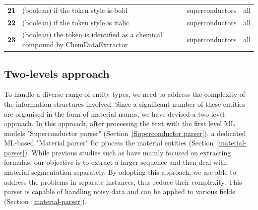 \begin{table}
\begin{tabular}{l m{30em} c c}
        \textbf{21}   & (boolean) if the token style is bold & superconductors & all                   \\
        \textbf{22}   & (boolean) if the token style is italic & superconductors & all                   \\
        \textbf{23}   & (boolean) the token is identified as a chemical compound by ChemDataExtractor\cite{chemdataextractor}                                                                                                                                                    & superconductors & all                   \\
        \bottomrule
    \end{tabular}
    \label{tab:ML-model-features}
\end{table}

\subsection{Two-levels approach}
\label{sec:two-levels-approach}

To handle a diverse range of entity types, we need to address the complexity of the information structures involved. Since a significant number of these entities are organised in the form of material names, we have devised a two-level approach. In this approach, after processing the text with the first level ML models "Superconductor parser" (Section~\ref{Superconductor parser}), a dedicated ML-based "Material parser" for process the material entities (Section~\ref{material-parser}). 
While previous studies such as \cite{kononova2019text, court2020magnetic, dieb2015framework} have mainly focused on extracting formulas, our objective is to extract a larger sequence and then deal with material segmentation separately. By adopting this approach, we are able to address the problems in separate instances, thus reduce their complexity. 
This parser is capable of handling noisy data and can be applied to various fields (Section~\ref{material-parser}).

